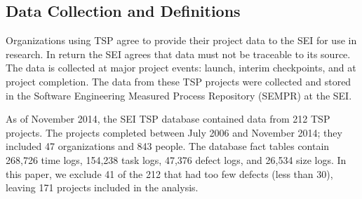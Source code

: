 \documentclass[smallcondensed]{svjour3}
\newcommand{\bi}{\begin{itemize}}%
\newcommand{\ei}{\end{itemize}}
\begin{document}
\subsection{Data Collection and Definitions}
\label{sect:data-collection}

Organizations using TSP agree to provide their project data to the SEI for use in research. In return the SEI agrees that  data must not be traceable to its source. The data is collected at major project events: launch, interim checkpoints, and at project completion. The data from these TSP projects were collected and stored in the Software Engineering Measured Process Repository (SEMPR) at the SEI. 

As of November 2014, the SEI TSP database contained data from 212
TSP projects. The projects completed between July 2006 and
November 2014; they included 47 organizations and 843 people. 
The database fact tables
contain 268,726 time logs, 
154,238 task logs,
 47,376 defect logs, 
and 26,534 size logs. 
In this paper, we exclude 41 of the 212 that had too few defects (less than 30), leaving 171 projects included in the analysis.

 

\end{document}
